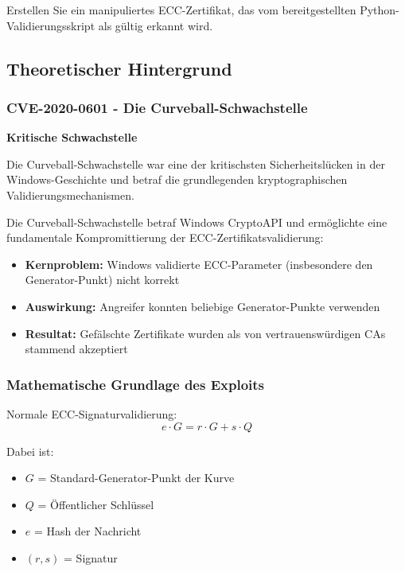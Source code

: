 \documentclass{article}
\begin{document}
\begin{tcolorbox}[colback=red!10,colframe=red,title=\textbf{Ziel}]
Erstellen Sie ein manipuliertes ECC-Zertifikat, das vom bereitgestellten Python-Validierungsskript als gültig erkannt wird.
\end{tcolorbox}

\subsection{Theoretischer Hintergrund}

\subsubsection{CVE-2020-0601 - Die Curveball-Schwachstelle}

\begin{warningbox}
\textbf{Kritische Schwachstelle}

Die Curveball-Schwachstelle war eine der kritischsten Sicherheitslücken in der Windows-Geschichte und betraf die grundlegenden kryptographischen Validierungsmechanismen.
\end{warningbox}

Die Curveball-Schwachstelle betraf Windows CryptoAPI und ermöglichte eine fundamentale Kompromittierung der ECC-Zertifikatsvalidierung:

\begin{itemize}[leftmargin=1.5cm]
    \item \textbf{Kernproblem:} Windows validierte ECC-Parameter (insbesondere den Generator-Punkt) nicht korrekt
    \item \textbf{Auswirkung:} Angreifer konnten beliebige Generator-Punkte verwenden
    \item \textbf{Resultat:} Gefälschte Zertifikate wurden als von vertrauenswürdigen CAs stammend akzeptiert
\end{itemize}

\subsubsection{Mathematische Grundlage des Exploits}

Normale ECC-Signaturvalidierung:
\begin{equation}
e \cdot G = r \cdot G + s \cdot Q
\end{equation}

Dabei ist:
\begin{itemize}
    \item $G$ = Standard-Generator-Punkt der Kurve
    \item $Q$ = Öffentlicher Schlüssel
    \item $e$ = Hash der Nachricht
    \item $(r,s)$ = Signatur
\end{itemize}
\end{document}
